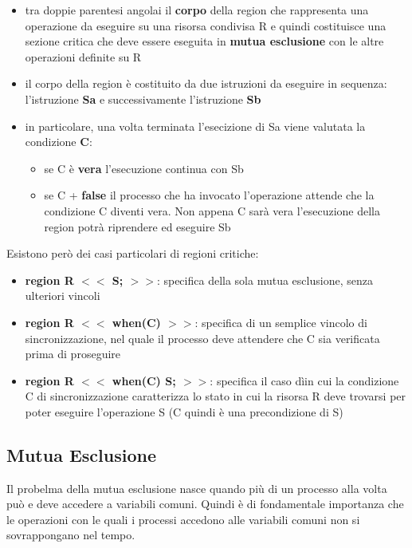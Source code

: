 \documentclass{article}
\begin{document}
\begin{itemize}
    \item tra doppie parentesi angolai il \textbf{corpo} della region che rappresenta una operazione da eseguire su una risorsa condivisa R e quindi costituisce una sezione critica
    che deve essere eseguita in \textbf{mutua esclusione} con le altre operazioni definite su R
    \item il corpo della region è costituito da due istruzioni da eseguire in sequenza: l'istruzione \textbf{Sa} e successivamente l'istruzione \textbf{Sb}
    \item in particolare, una volta terminata l'esecizione di Sa viene valutata la condizione \textbf{C}:
    \begin{itemize}
        \item se C è \textbf{vera} l'esecuzione continua con Sb
        \item se C + \textbf{false} il processo che ha invocato l'operazione attende che la condizione C diventi vera. Non appena C sarà vera l'esecuzione della region potrà riprendere
        ed eseguire Sb
    \end{itemize}
\end{itemize}

Esistono però dei casi particolari di regioni critiche:
\begin{itemize}
    \item \textbf{region R $<<$ S; $>>$}: specifica della sola mutua esclusione, senza ulteriori vincoli
    \item \textbf{region R $<<$ when(C) $>>$}: specifica di un semplice vincolo di sincronizzazione, nel quale il processo deve attendere che C sia verificata prima di proseguire
    \item \textbf{region R $<<$ when(C) S; $>>$}: specifica il caso dìin cui la condizione C di sincronizzazione caratterizza lo stato in cui la risorsa R deve trovarsi per poter
    eseguire l'operazione S (C quindi è una precondizione di S)
\end{itemize}

\subsection{Mutua Esclusione}

Il probelma della mutua esclusione nasce quando più di un processo alla volta può e deve accedere a variabili comuni. Quindi è di fondamentale importanza che le operazioni con le quali
i processi accedono alle variabili comuni non si sovrappongano nel tempo.
\end{document}
